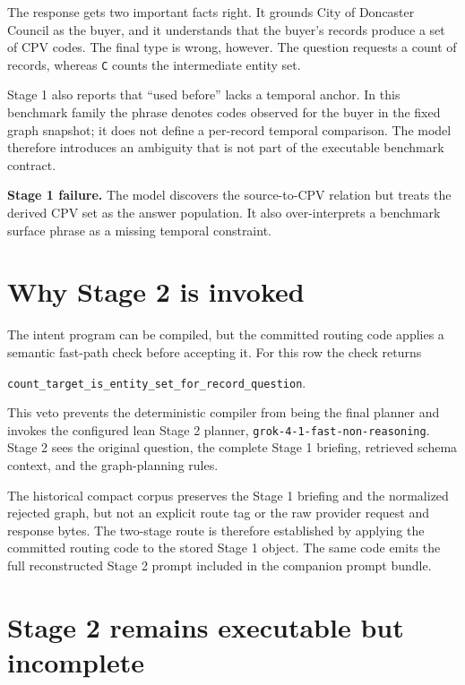 \documentclass[10pt]{article}
\newcommand{\artifact}[1]{\texttt{#1}}
\begin{document}
The response gets two important facts right.  It grounds City of Doncaster Council as the buyer,
and it understands that the buyer's records produce a set of CPV codes.  The final type is wrong,
however.  The question requests a count of records, whereas \artifact{C} counts the intermediate
entity set.

Stage 1 also reports that ``used before'' lacks a temporal anchor.  In this benchmark family the
phrase denotes codes observed for the buyer in the fixed graph snapshot; it does not define a
per-record temporal comparison.  The model therefore introduces an ambiguity that is not part of
the executable benchmark contract.

\begin{center}
\colorbox{errorred}{\parbox{0.88\linewidth}{\small
\textbf{Stage 1 failure.}  The model discovers the source-to-CPV relation but treats the derived CPV
set as the answer population.  It also over-interprets a benchmark surface phrase as a missing
temporal constraint.}}
\end{center}

\section{Why Stage 2 is invoked}

The intent program can be compiled, but the committed routing code applies a semantic fast-path
check before accepting it.  For this row the check returns
\begin{center}
\artifact{count\_target\_is\_entity\_set\_for\_record\_question}.
\end{center}
This veto prevents the deterministic compiler from being the final planner and invokes the
configured lean Stage 2 planner, \artifact{grok-4-1-fast-non-reasoning}.  Stage 2 sees the original
question, the complete Stage 1 briefing, retrieved schema context, and the graph-planning rules.

The historical compact corpus preserves the Stage 1 briefing and the normalized rejected graph,
but not an explicit route tag or the raw provider request and response bytes.  The two-stage route
is therefore established by applying the committed routing code to the stored Stage 1 object.  The
same code emits the full reconstructed Stage 2 prompt included in the companion prompt bundle.

\section{Stage 2 remains executable but incomplete}
\end{document}
